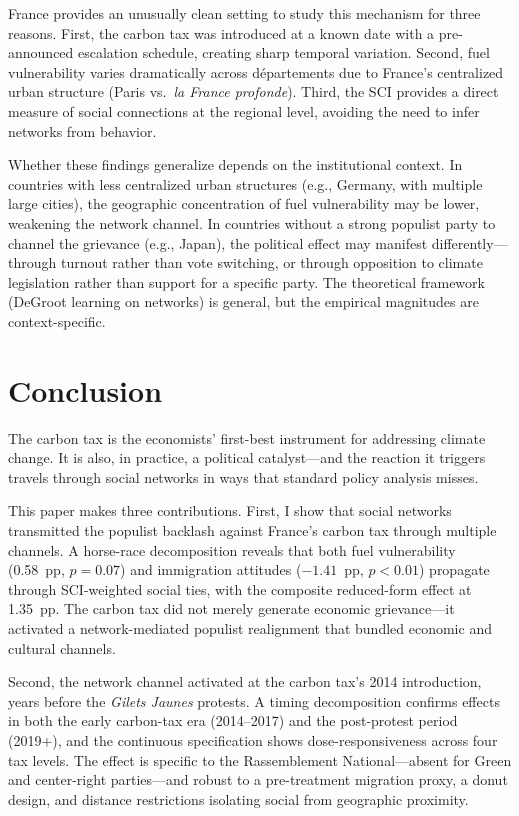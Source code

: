 \documentclass[12pt]{article}
\newcommand{\rn}{Rassemblement National}
\newcommand{\gj}{\textit{Gilets Jaunes}}
\newcommand{\depts}{d\'{e}partements}
\begin{document}
France provides an unusually clean setting to study this mechanism for three reasons. First, the carbon tax was introduced at a known date with a pre-announced escalation schedule, creating sharp temporal variation. Second, fuel vulnerability varies dramatically across \depts{} due to France's centralized urban structure (Paris vs.\ \textit{la France profonde}). Third, the SCI provides a direct measure of social connections at the regional level, avoiding the need to infer networks from behavior.

Whether these findings generalize depends on the institutional context. In countries with less centralized urban structures (e.g., Germany, with multiple large cities), the geographic concentration of fuel vulnerability may be lower, weakening the network channel. In countries without a strong populist party to channel the grievance (e.g., Japan), the political effect may manifest differently---through turnout rather than vote switching, or through opposition to climate legislation rather than support for a specific party. The theoretical framework (DeGroot learning on networks) is general, but the empirical magnitudes are context-specific.



\section{Conclusion}
\label{sec:conclusion}

The carbon tax is the economists' first-best instrument for addressing climate change. It is also, in practice, a political catalyst---and the reaction it triggers travels through social networks in ways that standard policy analysis misses.

This paper makes three contributions. First, I show that social networks transmitted the populist backlash against France's carbon tax through multiple channels. A horse-race decomposition reveals that both fuel vulnerability (0.58~pp, $p = 0.07$) and immigration attitudes ($-1.41$~pp, $p < 0.01$) propagate through SCI-weighted social ties, with the composite reduced-form effect at 1.35~pp. The carbon tax did not merely generate economic grievance---it activated a network-mediated populist realignment that bundled economic and cultural channels.

Second, the network channel activated at the carbon tax's 2014 introduction, years before the \gj{} protests. A timing decomposition confirms effects in both the early carbon-tax era (2014--2017) and the post-protest period (2019+), and the continuous specification shows dose-responsiveness across four tax levels. The effect is specific to the \rn{}---absent for Green and center-right parties---and robust to a pre-treatment migration proxy, a donut design, and distance restrictions isolating social from geographic proximity.
\end{document}

